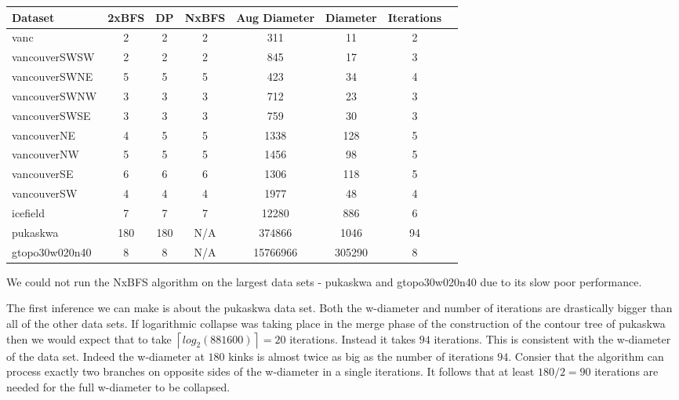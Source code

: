 \begin{center}
\begin{tabular}{l*{6}{c}r}
Dataset             & 2xBFS  & DP    & NxBFS    & Aug Diameter  & Diameter  & Iterations\\
\hline
vanc                & 2     & 2     & 2       & 311           & 11        & 2  \\
vancouverSWSW       & 2     & 2     & 2       & 845           & 17        & 3  \\
vancouverSWNE       & 5     & 5     & 5       & 423           & 34        & 4  \\
vancouverSWNW       & 3     & 3     & 3       & 712           & 23        & 3  \\
vancouverSWSE       & 3     & 3     & 3       & 759           & 30        & 3  \\
vancouverNE         & 4     & 5     & 5       & 1338          & 128       & 5  \\
vancouverNW         & 5     & 5     & 5       & 1456          & 98        & 5  \\
vancouverSE         & 6     & 6     & 6       & 1306          & 118       & 5  \\
vancouverSW         & 4     & 4     & 4       & 1977          & 48        & 4  \\
icefield            & 7     & 7     & 7       & 12280         & 886       & 6  \\
pukaskwa            & 180   & 180   & N/A     & 374866        & 1046      & 94 \\
gtopo30w020n40      & 8     & 8     & N/A     & 15766966      & 305290    & 8  \\

\end{tabular}
\end{center}

We could not run the NxBFS algorithm on the largest data sets - pukaskwa and gtopo30w020n40 due to its slow poor performance.

The first inference we can make is about the pukaskwa data set. Both the w-diameter and number of iterations are drastically bigger than all of the other data sets. If logarithmic collapse was taking place in the merge phase of the construction of the contour tree of pukaskwa then we would expect that to take $\left \lceil{log_2(881600)}\right \rceil = 20$ iterations. Instead it takes $94$ iterations. This is consistent with the w-diameter of the data set. Indeed the w-diameter at $180$ kinks is almost twice as big as the number of iterations $94$. Consier that the algorithm can process exactly two branches on opposite sides of the w-diameter in a single iterations. It follows that at least $180/2 = 90$ iterations are needed for the full w-diameter to be collapsed.


